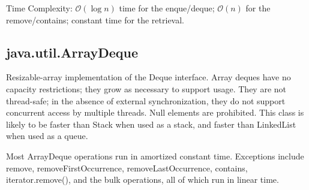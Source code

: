 \documentclass[a4paper]{article}
\begin{document}
Time Complexity: $\mathcal{O}(\log{}n)$ time for the enque/deque; $\mathcal{O}(n)$ for the remove/contains; constant time for the retrieval.

\subsection{java.util.ArrayDeque}
Resizable-array implementation of the Deque interface. Array deques have no capacity restrictions; they grow as necessary to support usage. They are not thread-safe; in the absence of external synchronization, they do not support concurrent access by multiple threads. Null elements are prohibited. This class is likely to be faster than Stack when used as a stack, and faster than LinkedList when used as a queue.

Most ArrayDeque operations run in amortized constant time. Exceptions include remove, removeFirstOccurrence, removeLastOccurrence, contains, iterator.remove(), and the bulk operations, all of which run in linear time.
\end{document}
